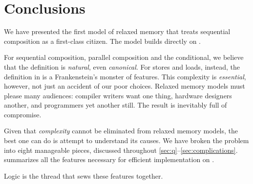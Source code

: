 \section{Conclusions}

We have presented the first model of relaxed memory that treats sequential
composition as a first-class citizen. The model builds directly on \jjr{}.

For sequential composition, parallel composition and the conditional, we
believe that the definition is \emph{natural}, even \emph{canonical}.
For stores and loads, instead, the definition in  is a
Frankenstein's monster of features.  This complexity is \emph{essential},
however, not just an accident of our poor choices.  Relaxed memory models must
please many audiences: compiler writers want one thing, hardware designers
another, and programmers yet another still.  The result is inevitably full of
compromise.

Given that \emph{complexity} cannot be eliminated from relaxed memory models,
the best one can do is attempt to understand its causes.  We have broken the
problem into eight manageable pieces, discussed throughout
\textsection\ref{sec:q}--\ref{sec:complications}.  
summarizes all the features necessary for efficient implementation on
\armeight{}.


{Logic} is the thread that sews these features together.




